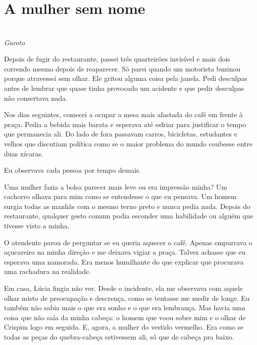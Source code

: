 \newpage

\ifdefined\useChapters
\chapter{A mulher sem nome}
\else
\chapter{}
\fi

\begin{center}
\textit{Garoto}
\end{center}

Depois de fugir do restaurante, passei três quarteirões invisível e mais dois correndo mesmo depois de reaparecer. Só parei quando um motorista buzinou porque atravessei sem olhar. Ele gritou alguma coisa pela janela. Pedi desculpas antes de lembrar que quase tinha provocado um acidente e que pedir desculpas não consertava nada.

Nos dias seguintes, comecei a ocupar a mesa mais afastada do café em frente à praça. Pedia a bebida mais barata e esperava até esfriar para justificar o tempo que permanecia ali. Do lado de fora passavam carros, bicicletas, estudantes e velhos que discutiam política como se o maior problema do mundo coubesse entre duas xícaras.

Eu observava cada pessoa por tempo demais.

Uma mulher fazia a bolsa parecer mais leve ou era impressão minha? Um cachorro olhava para mim como se entendesse o que eu pensava. Um homem surgia todas as manhãs com o mesmo terno preto e nunca pedia nada. Depois do restaurante, qualquer gesto comum podia esconder uma habilidade ou alguém que tivesse visto a minha.

O atendente parou de perguntar se eu queria aquecer o café. Apenas empurrava o açucareiro na minha direção e me deixava vigiar a praça. Talvez achasse que eu esperava uma namorada. Era menos humilhante do que explicar que procurava uma rachadura na realidade.

\medskip

Em casa, Lúcia fingia não ver.  
Desde o incidente, ela me observava com aquele olhar misto de preocupação e descrença, como se tentasse me medir de longe.  
Eu também não sabia mais o que era sonho e o que era lembrança.  
Mas havia uma coisa que não saía da minha cabeça: o homem que voou sobre mim e o olhar de Crispim logo em seguida.  
E, agora, a mulher do vestido vermelho.  
Era como se todas as peças do quebra-cabeça estivessem ali, só que de cabeça pra baixo.

